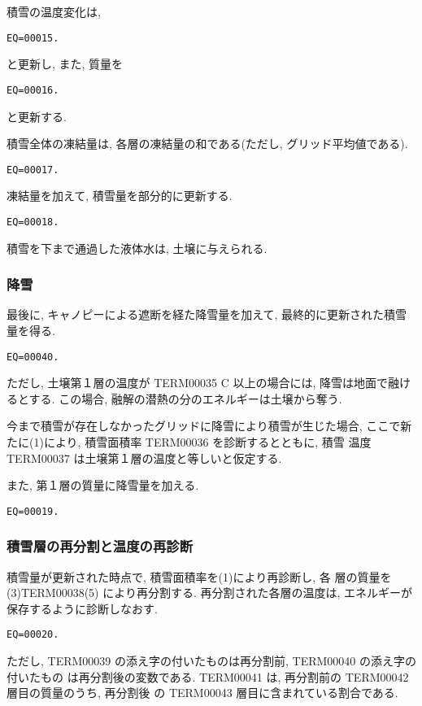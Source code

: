 積雪の温度変化は,
\begin{verbatim}
EQ=00015.
\end{verbatim}
と更新し, また, 質量を
\begin{verbatim}
EQ=00016.
\end{verbatim}
と更新する.

積雪全体の凍結量は, 各層の凍結量の和である(ただし, グリッド平均値である).
\begin{verbatim}
EQ=00017.
\end{verbatim}
凍結量を加えて, 積雪量を部分的に更新する.
\begin{verbatim}
EQ=00018.
\end{verbatim}

積雪を下まで通過した液体水は, 土壌に与えられる.

\subsubsection{降雪}

最後に, キャノピーによる遮断を経た降雪量を加えて, 最終的に更新された積雪
量を得る.
\begin{verbatim}
EQ=00040.
\end{verbatim}

ただし, 土壌第１層の温度が TERM00035 C 以上の場合には, 降雪は地面で融け
るとする. この場合, 融解の潜熱の分のエネルギーは土壌から奪う.

今まで積雪が存在しなかったグリッドに降雪により積雪が生じた場合, ここで新
たに(1)により, 積雪面積率 TERM00036 を診断するとともに, 積雪
温度 TERM00037 は土壌第１層の温度と等しいと仮定する.

また, 第１層の質量に降雪量を加える.
\begin{verbatim}
EQ=00019.
\end{verbatim}

\subsubsection{積雪層の再分割と温度の再診断}

積雪量が更新された時点で, 積雪面積率を(1)により再診断し, 各
層の質量を (3)TERM00038(5) により再分割する.
再分割された各層の温度は, エネルギーが保存するように診断しなおす.
\begin{verbatim}
EQ=00020.
\end{verbatim}
ただし, TERM00039 の添え字の付いたものは再分割前, TERM00040 の添え字の付いたもの
は再分割後の変数である.
TERM00041 は, 再分割前の TERM00042 層目の質量のうち, 再分割後
の TERM00043 層目に含まれている割合である.

